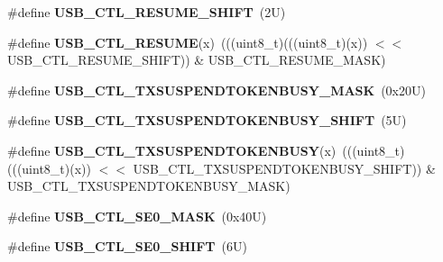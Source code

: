 \begin{DoxyCompactItemize}
\item 
\mbox{\label{group___u_s_b___register___masks_gab8354dafb3b0cb438770fe60ffec4714}} 
\#define {\bfseries U\+S\+B\+\_\+\+C\+T\+L\+\_\+\+R\+E\+S\+U\+M\+E\+\_\+\+S\+H\+I\+FT}~(2\+U)
\item 
\mbox{\label{group___u_s_b___register___masks_gabf5ce133606d0539b886b04537646d7d}} 
\#define {\bfseries U\+S\+B\+\_\+\+C\+T\+L\+\_\+\+R\+E\+S\+U\+ME}(x)~(((uint8\+\_\+t)(((uint8\+\_\+t)(x)) $<$$<$ U\+S\+B\+\_\+\+C\+T\+L\+\_\+\+R\+E\+S\+U\+M\+E\+\_\+\+S\+H\+I\+FT)) \& U\+S\+B\+\_\+\+C\+T\+L\+\_\+\+R\+E\+S\+U\+M\+E\+\_\+\+M\+A\+SK)
\item 
\mbox{\label{group___u_s_b___register___masks_gaa2e78edccdce1268888d45bc4d81cfe1}} 
\#define {\bfseries U\+S\+B\+\_\+\+C\+T\+L\+\_\+\+T\+X\+S\+U\+S\+P\+E\+N\+D\+T\+O\+K\+E\+N\+B\+U\+S\+Y\+\_\+\+M\+A\+SK}~(0x20\+U)
\item 
\mbox{\label{group___u_s_b___register___masks_gac6b9a4253ee9f3740d0c7b2692a44e8e}} 
\#define {\bfseries U\+S\+B\+\_\+\+C\+T\+L\+\_\+\+T\+X\+S\+U\+S\+P\+E\+N\+D\+T\+O\+K\+E\+N\+B\+U\+S\+Y\+\_\+\+S\+H\+I\+FT}~(5\+U)
\item 
\mbox{\label{group___u_s_b___register___masks_gae63db0f2199e12ce6091f6fb2a730b45}} 
\#define {\bfseries U\+S\+B\+\_\+\+C\+T\+L\+\_\+\+T\+X\+S\+U\+S\+P\+E\+N\+D\+T\+O\+K\+E\+N\+B\+U\+SY}(x)~(((uint8\+\_\+t)(((uint8\+\_\+t)(x)) $<$$<$ U\+S\+B\+\_\+\+C\+T\+L\+\_\+\+T\+X\+S\+U\+S\+P\+E\+N\+D\+T\+O\+K\+E\+N\+B\+U\+S\+Y\+\_\+\+S\+H\+I\+FT)) \& U\+S\+B\+\_\+\+C\+T\+L\+\_\+\+T\+X\+S\+U\+S\+P\+E\+N\+D\+T\+O\+K\+E\+N\+B\+U\+S\+Y\+\_\+\+M\+A\+SK)
\item 
\mbox{\label{group___u_s_b___register___masks_gac4c2c3ef09a72faaab7151297e8dfbe7}} 
\#define {\bfseries U\+S\+B\+\_\+\+C\+T\+L\+\_\+\+S\+E0\+\_\+\+M\+A\+SK}~(0x40\+U)
\item 
\mbox{\label{group___u_s_b___register___masks_gaa3a02fa6ec226d10d54353456d44fa88}} 
\#define {\bfseries U\+S\+B\+\_\+\+C\+T\+L\+\_\+\+S\+E0\+\_\+\+S\+H\+I\+FT}~(6\+U)

\end{DoxyCompactItemize}
